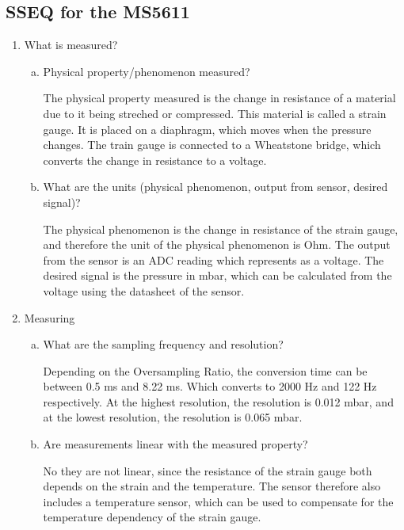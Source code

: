\subsection{SSEQ for the MS5611}
\begin{enumerate}
    \item What is measured?
    \begin{enumerate}[(a)]
        \item Physical property/phenomenon measured?

        The physical property measured is the change in resistance of a material due to it being streched or compressed.
        This material is called a strain gauge.
        It is placed on a diaphragm, which moves when the pressure changes.
        The train gauge is connected to a Wheatstone bridge, which converts the change in resistance to a voltage.



        \item What are the units (physical phenomenon, output from sensor, desired signal)?

        The physical phenomenon is the change in resistance of the strain gauge, and therefore the unit of the physical phenomenon is Ohm.
        The output from the sensor is an ADC reading which represents as a voltage.
        The desired signal is the pressure in mbar, which can be calculated from the voltage using the datasheet of the sensor.

    \end{enumerate}

    \item Measuring
    \begin{enumerate}[(a)]
        \item What are the sampling frequency and resolution?

        Depending on the Oversampling Ratio, the conversion time can be between 0.5 ms and 8.22 ms.
        Which converts to 2000 Hz and 122 Hz respectively.
        At the highest resolution, the resolution is 0.012 mbar, and at the lowest resolution, the resolution is 0.065 mbar.


        \item Are measurements linear with the measured property?

        No they are not linear, since the resistance of the strain gauge both depends on the strain and the temperature.
        The sensor therefore also includes a temperature sensor, which can be used to compensate for the temperature dependency of the strain gauge.




\end{enumerate}
\end{enumerate}
